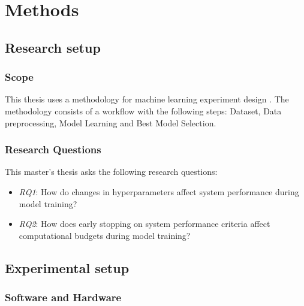 \chapter{Methods}
\label{chap:methods}

\section{Research setup}
\subsection{Scope}





This thesis uses a methodology for machine learning experiment design \parencite{fernandez-lozanoMethodologyDesignExperiments2016}. The methodology consists of a workflow with the following steps: Dataset, Data preprocessing, Model Learning and Best Model Selection. 


\subsection{Research Questions}
This master's thesis asks the following research questions:
\begin{itemize}
    \item \emph{RQ1}: How do changes in hyperparameters affect system performance during model training?
    \item \emph{RQ2}: How does early stopping on system performance criteria affect computational budgets during model training?
          
\end{itemize}

\section{Experimental setup}

\subsection{Software and Hardware}

